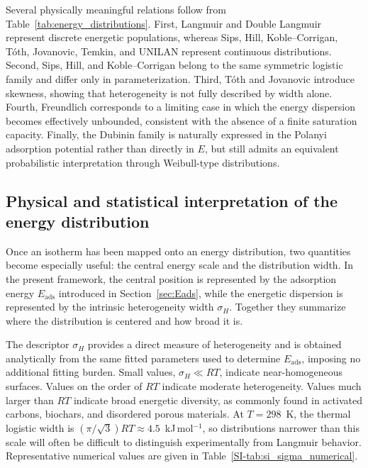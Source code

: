 \documentclass[journal=jacsat,manuscript=article]{achemso}
\begin{document}
	Several physically meaningful relations follow from Table~\ref{tab:energy_distributions}. First, Langmuir and Double Langmuir represent discrete energetic populations, whereas Sips, Hill, Koble--Corrigan, T\'{o}th, Jovanovic, Temkin, and UNILAN represent continuous distributions. Second, Sips, Hill, and Koble--Corrigan belong to the same symmetric logistic family and differ only in parameterization. Third, T\'{o}th and Jovanovic introduce skewness, showing that heterogeneity is not fully described by width alone. Fourth, Freundlich corresponds to a limiting case in which the energy dispersion becomes effectively unbounded, consistent with the absence of a finite saturation capacity. Finally, the Dubinin family is naturally expressed in the Polanyi adsorption potential rather than directly in $E$, but still admits an equivalent probabilistic interpretation through Weibull-type distributions.
	
	\subsection{Physical and statistical interpretation of the energy distribution}
	\label{sec:sigma_E}
	
	Once an isotherm has been mapped onto an energy distribution, two quantities become especially useful: the central energy scale and the distribution width. In the present framework, the central position is represented by the adsorption energy $E_{\mathrm{ads}}$ introduced in Section~\ref{sec:Eads}, while the energetic dispersion is represented by the intrinsic heterogeneity width $\sigma_H$. Together they summarize where the distribution is centered and how broad it is.
	
	The descriptor $\sigma_H$ provides a direct measure of heterogeneity and is obtained analytically from the same fitted parameters used to determine $E_{\mathrm{ads}}$, imposing no additional fitting burden. Small values, $\sigma_H \ll RT$, indicate near-homogeneous surfaces. Values on the order of $RT$ indicate moderate heterogeneity. Values much larger than $RT$ indicate broad energetic diversity, as commonly found in activated carbons, biochars, and disordered porous materials. At $T=298$~K, the thermal logistic width is $(\pi/\sqrt{3})RT \approx 4.5$~kJ\,mol$^{-1}$, so distributions narrower than this scale will often be difficult to distinguish experimentally from Langmuir behavior. Representative numerical values are given in Table~\ref{SI-tab:si_sigma_numerical}.
	
\end{document}
